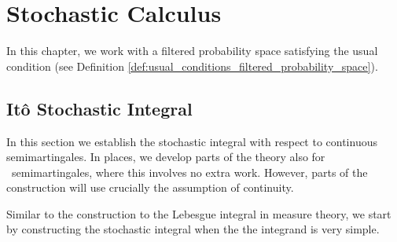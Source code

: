 \chapter{Stochastic Calculus}

In this chapter, we work with a filtered probability space satisfying the usual condition (see Definition \ref{def:usual_conditions_filtered_probability_space}).%

\section{It\^o Stochastic Integral}

In this section we establish the stochastic integral with respect to continuous semimartingales. In places, we develop parts of the theory also for \cadlag\ semimartingales, where this involves no extra work. However, parts of the construction will use crucially the assumption of continuity. %








Similar to the construction to the Lebesgue integral in measure theory, we start by constructing the stochastic integral when the the integrand is very simple.


